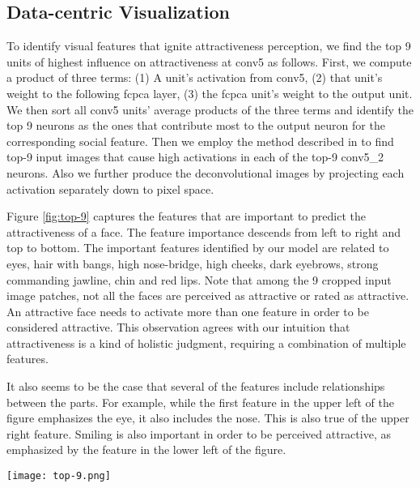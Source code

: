 \documentclass[10pt,twocolumn,letterpaper]{article}
\begin{document}
\subsection{Data-centric Visualization}
\label{data-centric}
To identify visual features that ignite attractiveness perception, we find the top 9 units of highest influence on attractiveness at conv5 as follows. First, we compute a product of three terms: (1) A unit's activation from conv5, (2) that unit's weight to the following fc\textunderscore pca layer, (3) the fc\textunderscore pca unit's weight to the output unit. We then sort all conv5 units' average products of the three terms and identify the top 9 neurons as the ones that contribute most to the output neuron for the corresponding social feature. 
Then we employ the method described in \cite{yosinski2015understanding,zeiler2014visualizing} to find top-9 input images that cause high activations in each of the top-9 conv5\_2 neurons. Also we further produce the deconvolutional images by projecting each activation separately down to pixel space.

Figure \ref{fig:top-9} captures the features that are important to predict the attractiveness of a face. The feature importance descends from left to right and  top to bottom. The important features identified by our model are related to eyes, hair with bangs, high nose-bridge, high cheeks, dark eyebrows, strong commanding jawline, chin and red lips. Note that among the 9 cropped input image patches, not all the faces are perceived as attractive or rated as attractive. An attractive face needs to activate more than one feature in order to be considered attractive. This observation agrees with our intuition that attractiveness is a kind of holistic judgment, requiring a combination of multiple features. 

It also seems to be the case that several of the features include relationships between the parts. For example, while the first feature in the upper left of the figure emphasizes the eye, it also includes the nose. This is also true of the upper right feature. Smiling is also important in order to be perceived attractive, as emphasized by the feature in the lower left of the figure.
\begin{figure*}[ht]
\centering
\texttt{[image: top-9.png]}
\caption{Visualization of features in the pretrained-VGG16 regression network. For conv5 layer, we show the top 9 activations of the top 9 neurons that maximally activate the attractiveness neuron across the training data, projected down to pixel space using the deconvolutional network approach \cite{zeiler2014visualizing} and their corresponding cropped image patches. Best viewed in electronic form, and zoomed in. }
\label{fig:top-9}
\end{figure*}
\end{document}
